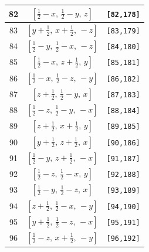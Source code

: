 \documentclass[fleqn,8pt]{jsarticle}
\begin{document}
\begin{longtable}{ccc}
82 & $\left[ \frac{1}{2} - x,\, \frac{1}{2} - y,\, z \right]$ & {\tt [82,178]} \\ \hline
83 & $\left[ y + \frac{1}{2},\, x + \frac{1}{2},\, - z \right]$ & {\tt [83,179]} \\ \hline
84 & $\left[ \frac{1}{2} - y,\, \frac{1}{2} - x,\, - z \right]$ & {\tt [84,180]} \\ \hline
85 & $\left[ \frac{1}{2} - x,\, z + \frac{1}{2},\, y \right]$ & {\tt [85,181]} \\ \hline
86 & $\left[ \frac{1}{2} - x,\, \frac{1}{2} - z,\, - y \right]$ & {\tt [86,182]} \\ \hline
87 & $\left[ z + \frac{1}{2},\, \frac{1}{2} - y,\, x \right]$ & {\tt [87,183]} \\ \hline
88 & $\left[ \frac{1}{2} - z,\, \frac{1}{2} - y,\, - x \right]$ & {\tt [88,184]} \\ \hline
89 & $\left[ z + \frac{1}{2},\, x + \frac{1}{2},\, y \right]$ & {\tt [89,185]} \\ \hline
90 & $\left[ y + \frac{1}{2},\, z + \frac{1}{2},\, x \right]$ & {\tt [90,186]} \\ \hline
91 & $\left[ \frac{1}{2} - y,\, z + \frac{1}{2},\, - x \right]$ & {\tt [91,187]} \\ \hline
92 & $\left[ \frac{1}{2} - z,\, \frac{1}{2} - x,\, y \right]$ & {\tt [92,188]} \\ \hline
93 & $\left[ \frac{1}{2} - y,\, \frac{1}{2} - z,\, x \right]$ & {\tt [93,189]} \\ \hline
94 & $\left[ z + \frac{1}{2},\, \frac{1}{2} - x,\, - y \right]$ & {\tt [94,190]} \\ \hline
95 & $\left[ y + \frac{1}{2},\, \frac{1}{2} - z,\, - x \right]$ & {\tt [95,191]} \\ \hline
96 & $\left[ \frac{1}{2} - z,\, x + \frac{1}{2},\, - y \right]$ & {\tt [96,192]} \\
\end{longtable}
\end{document}
